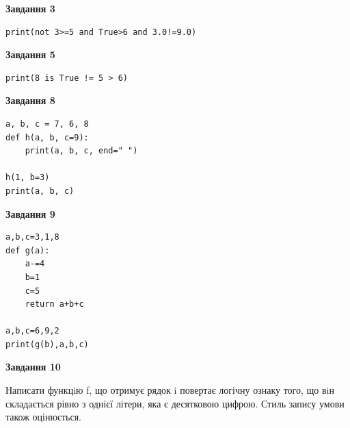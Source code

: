 \documentclass[12pt, ukrainian]{article}
\begin{document}
{\begin {large}
\begin{minipage}[t]{7.5cm}
\end{minipage}
\vline \hspace{6mm}
\begin{minipage}[t]{10.5cm}

\begin{center}
\textbf{Завдання 3}
\end{center}

\begin{verbatim}
print(not 3>=5 and True>6 and 3.0!=9.0)
\end{verbatim}



\begin{center}
\textbf{Завдання 5}
\end{center}

\begin{verbatim}
print(8 is True != 5 > 6)
\end{verbatim}



\begin{center}
\textbf{Завдання 8}
\end{center}

\begin{verbatim}
a, b, c = 7, 6, 8
def h(a, b, c=9):
    print(a, b, c, end=" ")

h(1, b=3)
print(a, b, c)
\end{verbatim}



\begin{center}
\textbf{Завдання 9}
\end{center}

\begin{verbatim}
a,b,c=3,1,8
def g(a):
    a-=4
    b=1
    c=5
    return a+b+c

a,b,c=6,9,2
print(g(b),a,b,c)
\end{verbatim}



\begin{center}
\textbf{Завдання 10}
\end{center}

Написати функцiю f, що отримує рядок i повертає логічну ознаку того, що вiн складається рівно з однієї літери, яка є десятковою цифрою. Стиль запису умови також оцінюється.\par

\end{minipage}

\end {large}}
\newpage
\end{document}
